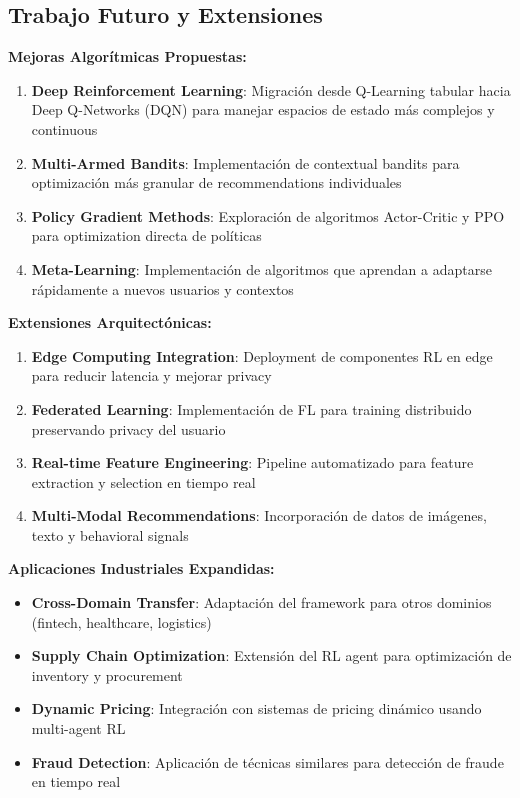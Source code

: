 \subsection{Trabajo Futuro y Extensiones}
\label{subsec:trabajo_futuro}

\textbf{Mejoras Algorítmicas Propuestas:}

\begin{enumerate}[leftmargin=*, itemsep=0.1cm]
\item \textbf{Deep Reinforcement Learning}: Migración desde Q-Learning tabular hacia Deep Q-Networks (DQN) para manejar espacios de estado más complejos y continuous
\item \textbf{Multi-Armed Bandits}: Implementación de contextual bandits para optimización más granular de recommendations individuales  
\item \textbf{Policy Gradient Methods}: Exploración de algoritmos Actor-Critic y PPO para optimization directa de políticas
\item \textbf{Meta-Learning}: Implementación de algoritmos que aprendan a adaptarse rápidamente a nuevos usuarios y contextos
\end{enumerate}

\textbf{Extensiones Arquitectónicas:}

\begin{enumerate}[leftmargin=*, itemsep=0.1cm]
\item \textbf{Edge Computing Integration}: Deployment de componentes RL en edge para reducir latencia y mejorar privacy
\item \textbf{Federated Learning}: Implementación de FL para training distribuido preservando privacy del usuario
\item \textbf{Real-time Feature Engineering}: Pipeline automatizado para feature extraction y selection en tiempo real
\item \textbf{Multi-Modal Recommendations}: Incorporación de datos de imágenes, texto y behavioral signals
\end{enumerate}

\textbf{Aplicaciones Industriales Expandidas:}

\begin{itemize}[leftmargin=*, itemsep=0.1cm]
\item \textbf{Cross-Domain Transfer}: Adaptación del framework para otros dominios (fintech, healthcare, logistics)
\item \textbf{Supply Chain Optimization}: Extensión del RL agent para optimización de inventory y procurement
\item \textbf{Dynamic Pricing}: Integración con sistemas de pricing dinámico usando multi-agent RL
\item \textbf{Fraud Detection}: Aplicación de técnicas similares para detección de fraude en tiempo real
\end{itemize}

